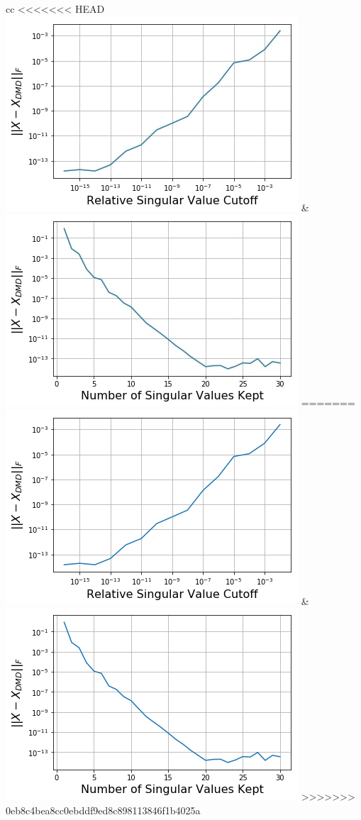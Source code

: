 \documentclass{style/nseJournal}
\begin{document}
	\begin{array}{cc}
<<<<<<< HEAD
		\includegraphics[scale=0.5]{figures/cutoffStudy_flux.jpg} &
		\includegraphics[scale=0.5]{figures/rankStudy_flux.jpg}
=======
		\includegraphics[scale=0.5]{figures/cutoffStudy_flux.png} &
		\includegraphics[scale=0.5]{figures/rankStudy_flux.png}
>>>>>>> 0eb8c4bea8cc0ebddf9ed8c898113846f1b4025a
	\end{array}
\end{document}
